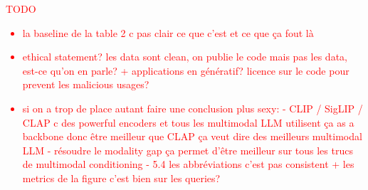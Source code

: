 \documentclass{article}
\newcommand{\comm}[1]{\textcolor{red}{TODO #1}}
\begin{document}
\comm{
\begin{itemize}
    \item la baseline de la table 2 c pas clair ce que c'est et ce que ça fout là
    \item ethical statement? les data sont clean, on publie le code mais pas les data, est-ce qu'on en parle? + applications en génératif? licence sur le code pour prevent les malicious usages?
    \item si on a trop de place autant faire une conclusion plus sexy:
    - CLIP / SigLIP / CLAP c des powerful encoders et tous les multimodal LLM utilisent ça as a backbone donc être meilleur que CLAP ça veut dire des meilleurs multimodal LLM
    - résoudre le modality gap ça permet d'être meilleur sur tous les trucs de multimodal conditioning
    - 5.4 les abbréviations c'est pas consistent + les metrics de la figure c'est bien sur les queries?
\end{itemize}}

\clearpage



% 





\end{document}
